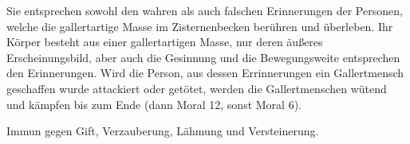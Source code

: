 Sie entsprechen sowohl den wahren als auch falschen Erinnerungen der
Personen, welche die gallertartige Masse im Zisternenbecken berühren
und überleben. Ihr Körper besteht aus einer gallertartigen Masse,
nur deren äußeres Erscheinungsbild, aber auch die Gesinnung und die
Bewegungsweite entsprechen den Erinnerungen. Wird
die Person, aus dessen Errinnerungen ein Gallertmensch geschaffen
wurde attackiert oder getötet, werden die Gallertmenschen wütend
und kämpfen bis zum Ende (dann Moral 12, sonst Moral 6).

Immun gegen Gift, Verzauberung, Lähmung und Versteinerung.


